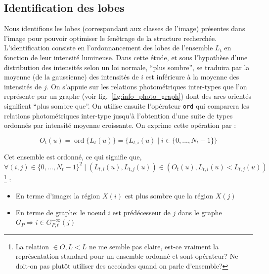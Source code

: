 \newpage
      \subsection{Identification des lobes}
	Nous identifions les lobes (correspondant aux classes de l'image) présentes dans l'image pour pouvoir optimiser le fenêtrage de la structure recherchée. L'identification consiste en l'ordonnancement des lobes de l'ensemble $L_t$ en fonction de leur intensité lumineuse. Dans cette étude, et sous l'hypothèse d'une distribution des intensités selon un loi normale, ``plus sombre'', se traduira par la moyenne (de la gaussienne) des intensités de $i$ est inférieure à la moyenne des intensités de $j$. On s'appuie sur les relations photométriques inter-types que l'on représente par un graphe (voir fig.~\ref{fig:info_photo_graph}) dont des arcs orientés signifient ``plus sombre que''. On utilise ensuite l'opérateur \texttt{ord} qui comparera les relations photométriques inter-type jusqu'à l'obtention d'une suite de types ordonnés par intensité moyenne croissante. On exprime cette opération par :



	\begin{equation}
		O_t(u) = \operatorname{ord} \{ L_t(u) \} = \{ L_{t,i}(u) \; |\; i \in \{0,...,N_t-1\} \}
		\label{eq:8}
	\end{equation}

	Cet ensemble est ordonné, ce qui signifie que, $\forall (i,j) \in \{0,...,N_t-1\}^2\; |\; \left( L_{t,i}\left(u\right),L_{t,j}\left(u\right)\right) \in \left( O_t\left(u\right), L_{t,i}\left(u\right) < L_{t,j}\left(u\right)\right)$ \footnote{La relation $\in O, L < L$ ne me semble pas claire, est-ce vraiment la représentation standard pour un ensemble ordonné et sont opérateur? Ne doit-on pas plutôt utiliser des accolades quand on parle d'ensemble?} :
	\begin{itemize}
		\item
		En terme d'image: la région $X(i)$ est plus sombre que la région $X(j)$
		\item
		En terme de graphe: le noeud $i$ est prédécesseur de $j$ dans le graphe $G_{P} \Rightarrow i \in G_{P,t}^{-\infty}(j)$
	\end{itemize}

